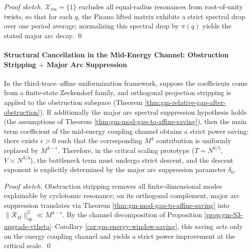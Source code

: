 \begin{proof}[Proof sketch]
\(\mathcal{X}_{\mathrm{res}}=\{1\}\) excludes all equal-radius resonances from root-of-unity twists, so that for each \(q\), the Pisano lifted matrix exhibits a strict spectral drop over one period average; normalizing this spectral drop by \(\pi(q)\) yields the stated major arc decay. \qed
\end{proof}

\paragraph{Structural Cancellation in the Mid-Energy Channel: Obstruction Stripping \texorpdfstring{$+$}{+} Major Arc Suppression}
\begin{theorem}\label{thm:gm-mid-energy-elimination}
In the third-trace--affine uniformization framework, suppose the coefficients come from a finite-state Zeckendorf family, and orthogonal projection stripping is applied to the obstruction subspace (Theorem \ref{thm:gm-relative-gap-after-obstruction}).
If additionally the major arc spectral suppression hypothesis holds (the assumptions of Theorem \ref{thm:gm-mod-gap-to-affine-saving}), then the main term coefficient of the mid-energy coupling channel obtains a strict power saving: there exists \(\epsilon>0\) such that the corresponding \(M^4\) contribution is uniformly replaced by \(M^{4-\epsilon}\).
Therefore, in the critical scaling prototype (\(T=N^{6/5}\), \(V\asymp N^{3/4}\)), the bottleneck term must undergo strict descent, and the descent exponent is explicitly determined by the major arc suppression parameter \(\delta_0\).
\end{theorem}

\begin{proof}[Proof sketch]
Obstruction stripping removes all finite-dimensional modes explainable by cyclotomic resonance; on its orthogonal complement, major arc suppression translates via Theorem \ref{thm:gm-mod-gap-to-affine-saving} into \(\|\mathcal{R}_M\|_{\mathrm{op}}^2\ll M^{4-\epsilon}\).
By the channel decomposition of Proposition \ref{prop:gm-S3-upgrade-vtheta}--Corollary \ref{cor:gm-energy-window-saving}, this saving acts only on the energy coupling channel and yields a strict power improvement at the critical scale. \qed
\end{proof}

